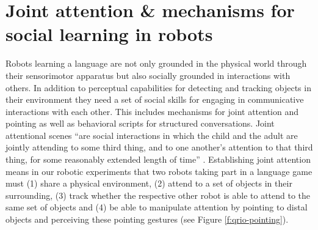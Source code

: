 \section{Joint attention \& mechanisms for social learning in robots}
\label{s:joint-attention-and-social-skills}

Robots learning a language are not only grounded in the physical world
through their sensorimotor apparatus but also socially grounded in
interactions with others. In addition to perceptual capabilities for
detecting and tracking objects in their environment they need a set of
social skills for engaging in communicative interactions with each
other. This includes mechanisms for joint attention and pointing as
well as behavioral scripts for structured conversations. Joint
attentional scenes \citep{tomasello95jointattention} ``are social
interactions in which the child and the adult are jointly attending to
some third thing, and to one another's attention to that third thing,
for some reasonably extended length of time''
\citep[p. 97]{tomasello99cultural}. Establishing joint attention means
in our robotic experiments that two robots taking part in a language
game must (1) share a physical environment, (2) attend to a set of
objects in their surrounding, (3) track whether the respective other
robot is able to attend to the same set of objects and (4) be able to
manipulate attention by pointing to distal objects and perceiving
these pointing gestures (see Figure \ref{f:qrio-pointing}).

